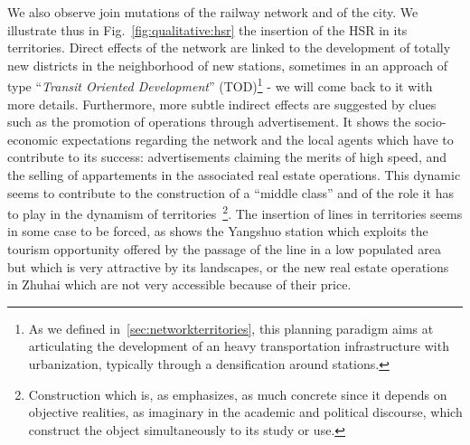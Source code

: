 We also observe join mutations of the railway network and of the city. We illustrate thus in Fig.~\ref{fig:qualitative:hsr} the insertion of the HSR in its territories. Direct effects of the network are linked to the development of totally new districts in the neighborhood of new stations, sometimes in an approach of type ``\emph{Transit Oriented Development}'' (TOD)\footnote{As we defined in~\ref{sec:networkterritories}, this planning paradigm aims at articulating the development of an heavy transportation infrastructure with urbanization, typically through a densification around stations.} - we will come back to it with more details. Furthermore, more subtle indirect effects are suggested by clues such as the promotion of operations through advertisement. It shows the socio-economic expectations regarding the network and the local agents which have to contribute to its success: advertisements claiming the merits of high speed, and the selling of appartements in the associated real estate operations. This dynamic seems to contribute to the construction of a ``middle class'' and of the role it has to play in the dynamism of territories~\cite{rocca2008power}\footnote{Construction which is, as  emphasizes, as much concrete since it depends on objective realities, as imaginary in the academic and political discourse, which construct the object simultaneously to its study or use.}. The insertion of lines in territories seems in some case to be forced, as shows the Yangshuo station which exploits the tourism opportunity offered by the passage of the line in a low populated area but which is very attractive by its landscapes, or the new real estate operations in Zhuhai which are not very accessible because of their price.


